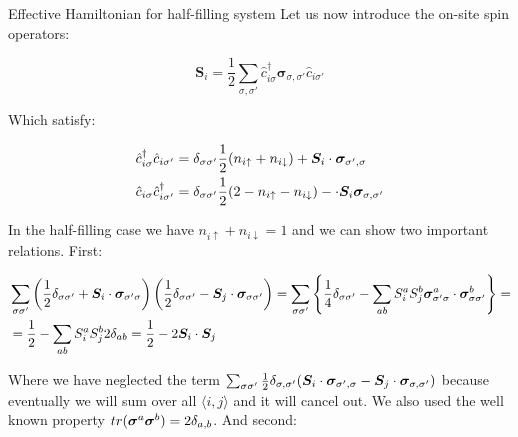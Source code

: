 \begin{section}{Effective Hamiltonian for half-filling system}
Let us now introduce the on-site spin operators:

\begin{equation}
\label{SpinOperators}
\boldsymbol{S}_i = \frac{1}{2} \sum_{\sigma, \sigma'} \hat{c}_{i \sigma}^\dagger \boldsymbol{\sigma}_{\sigma, \sigma'} \hat{c}_{i \sigma'}
\end{equation}

Which satisfy:

\begin{align}
\hat{c}_{i \sigma}^\dagger \hat{c}_{i \sigma'} &= \delta_{\sigma \sigma'} \frac{1}{2} (n_{i \uparrow} + n_{i \downarrow}) + \boldsymbol{S}_i\cdot\boldsymbol{\sigma}_{\sigma', \sigma} \label{SpinOperatorInv1}\\ 
\hat{c}_{i \sigma} \hat{c}_{i \sigma'}^\dagger &= \delta_{\sigma \sigma'} \frac{1}{2} (2 - n_{i \uparrow} - n_{i \downarrow}) - \cdot\boldsymbol{S}_i\boldsymbol{\sigma}_{\sigma, \sigma'} \label{SpinOperatorInv2}
\end{align}

In the half-filling case we have $n_{i \uparrow} + n_{i \downarrow} = 1$ and we can show two important relations. First:

\begin{align*}
&\sum_{\sigma \sigma'} \left(\frac{1}{2}\delta_{\sigma \sigma'} + \boldsymbol{S}_i\cdot\boldsymbol{\sigma}_{\sigma' \sigma}\right)\left(\frac{1}{2}\delta_{\sigma \sigma'}-\boldsymbol{S}_j\cdot\boldsymbol{\sigma}_{\sigma \sigma'}\right) = \sum_{\sigma \sigma'} \left\{ \frac{1}{4}\delta_{\sigma \sigma'} - \sum_{ab} S_i^aS_j^b 	\boldsymbol{\sigma}_{\sigma'\sigma}^a \cdot \boldsymbol{\sigma}_{\sigma \sigma'}^b \right\}= \\
&= \frac{1}{2} - \sum_{ab} S_i^aS_j^b	2\delta_{ab} = \frac{1}{2} - 2\boldsymbol{S}_i\cdot\boldsymbol{S}_j
\end{align*}

Where we have neglected the term $\sum_{\sigma \sigma'} \frac{1}{2}\delta_{\sigma,\sigma'}(\boldsymbol{S}_i\cdot\boldsymbol{\sigma}_{\sigma',\sigma} - \boldsymbol{S}_j\cdot\boldsymbol{\sigma}_{\sigma,\sigma'})$ because eventually we will sum over all $\langle i, j \rangle$ and it will cancel out. We also used the well known property $tr(\boldsymbol{\sigma}^a\boldsymbol{\sigma}^b)=2\delta_{a,b}$. And second:


\end{section}
